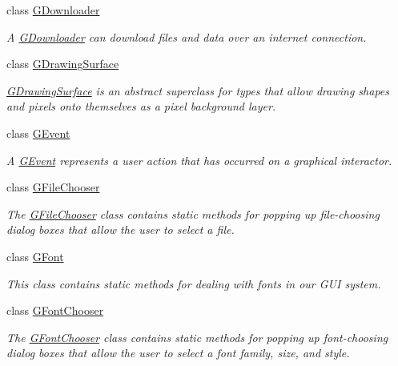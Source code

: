 \begin{DoxyCompactItemize}
class \mbox{\hyperlink{classsgl_1_1GDownloader}{G\+Downloader}}
\begin{DoxyCompactList}\small\item\em A \mbox{\hyperlink{classsgl_1_1GDownloader}{G\+Downloader}} can download files and data over an internet connection. \end{DoxyCompactList}\item 
class \mbox{\hyperlink{classsgl_1_1GDrawingSurface}{G\+Drawing\+Surface}}
\begin{DoxyCompactList}\small\item\em \mbox{\hyperlink{classsgl_1_1GDrawingSurface}{G\+Drawing\+Surface}} is an abstract superclass for types that allow drawing shapes and pixels onto themselves as a pixel background layer. \end{DoxyCompactList}\item 
class \mbox{\hyperlink{classsgl_1_1GEvent}{G\+Event}}
\begin{DoxyCompactList}\small\item\em A \mbox{\hyperlink{classsgl_1_1GEvent}{G\+Event}} represents a user action that has occurred on a graphical interactor. \end{DoxyCompactList}\item 
class \mbox{\hyperlink{classsgl_1_1GFileChooser}{G\+File\+Chooser}}
\begin{DoxyCompactList}\small\item\em The \mbox{\hyperlink{classsgl_1_1GFileChooser}{G\+File\+Chooser}} class contains static methods for popping up file-\/choosing dialog boxes that allow the user to select a file. \end{DoxyCompactList}\item 
class \mbox{\hyperlink{classsgl_1_1GFont}{G\+Font}}
\begin{DoxyCompactList}\small\item\em This class contains static methods for dealing with fonts in our G\+UI system. \end{DoxyCompactList}\item 
class \mbox{\hyperlink{classsgl_1_1GFontChooser}{G\+Font\+Chooser}}
\begin{DoxyCompactList}\small\item\em The \mbox{\hyperlink{classsgl_1_1GFontChooser}{G\+Font\+Chooser}} class contains static methods for popping up font-\/choosing dialog boxes that allow the user to select a font family, size, and style. \end{DoxyCompactList}\item 

\end{DoxyCompactItemize}
